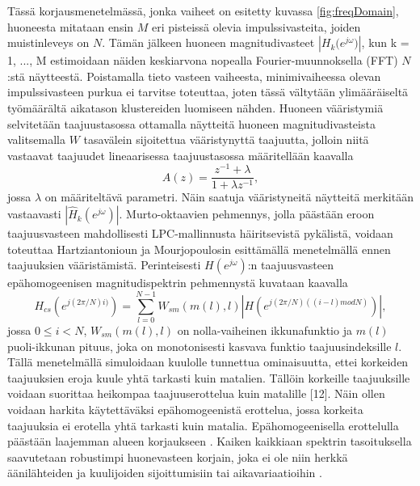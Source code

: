 \documentclass[finnish,12pt]{article}
\begin{document}
Tässä korjausmenetelmässä, jonka vaiheet on esitetty kuvassa \ref{fig:freqDomain}, huoneesta mitataan ensin $M$ eri pisteissä olevia impulssivasteita, joiden muistinleveys on $N$. Tämän jälkeen huoneen magnitudivasteet $|{H_k(e^{j \omega}})|$, kun k = 1, ..., M estimoidaan näiden keskiarvona nopealla Fourier-muunnoksella (FFT) $N$:stä näytteestä. Poistamalla tieto vasteen vaiheesta, minimivaiheessa olevan impulssivasteen purkua ei tarvitse toteuttaa, joten tässä vältytään ylimääräiseltä työmäärältä aikatason klustereiden luomiseen nähden. Huoneen vääristymiä selvitetään taajuustasossa ottamalla näytteitä huoneen magnitudivasteista valitsemalla $W$ tasavälein sijoitettua vääristynyttä taajuutta, jolloin niitä vastaavat taajuudet lineaarisessa taajuustasossa määritellään kaavalla \begin{equation} A(z) = \frac{z^{-1}+\lambda}{1+\lambda z^{-1}}, \end{equation} jossa $\lambda$ on määriteltävä parametri. Näin saatuja vääristyneitä näytteitä merkitään vastaavasti $|\hat{H}_k(e^{j \omega})|$. Murto-oktaavien pehmennys, jolla päästään eroon taajuusvasteen mahdollisesti LPC-mallinnusta häiritsevistä pykälistä, voidaan toteuttaa Hartziantonioun ja Mourjopoulosin \cite{Hatziantoniou2000} esittämällä menetelmällä ennen taajuuksien vääristämistä. Perinteisesti $H(e^{j \omega})$:n taajuusvasteen epähomogeenisen magnitudispektrin pehmennystä kuvataan kaavalla \begin{equation}
\label{magnitudispektrin pehmennys}
H_{cs}(e^{j (2 \pi / N)i)}) = \sum\limits_{l=0}^{N-1} W_{sm}(m(l),l)\left|H(e^{j(2 \pi / N)((i-l)mod N)})\right|, 
\end{equation} jossa $0 \le i < N$, $W_{sm}(m(l),l)$ on nolla-vaiheinen ikkunafunktio ja $m(l)$ puoli-ikkunan pituus, joka on monotonisesti kasvava funktio taajuusindeksille $l$. Tällä menetelmällä simuloidaan kuulolle tunnettua ominaisuutta, ettei korkeiden taajuuksien eroja kuule yhtä tarkasti kuin matalien. Tällöin korkeille taajuuksille voidaan suorittaa heikompaa taajuuserottelua kuin matalille [12]. Näin ollen voidaan harkita käytettäväksi epähomogeenistä erottelua, jossa korkeita taajuuksia ei erotella yhtä tarkasti kuin matalia. Epähomogeenisella erottelulla päästään laajemman alueen korjaukseen \cite{Genereux1992}. Kaiken kaikkiaan spektrin tasoituksella saavutetaan robustimpi huonevasteen korjain, joka ei ole niin herkkä äänilähteiden ja kuulijoiden sijoittumisiin tai aikavariaatioihin \cite{Hatziantoniou2003}. 
\end{document}
